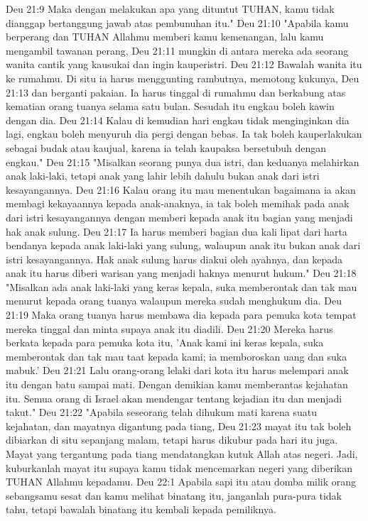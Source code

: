 Deu 21:9  Maka dengan melakukan apa yang dituntut TUHAN, kamu tidak dianggap bertanggung jawab atas pembunuhan itu."
Deu 21:10  "Apabila kamu berperang dan TUHAN Allahmu memberi kamu kemenangan, lalu kamu mengambil tawanan perang,
Deu 21:11  mungkin di antara mereka ada seorang wanita cantik yang kausukai dan ingin kauperistri.
Deu 21:12  Bawalah wanita itu ke rumahmu. Di situ ia harus menggunting rambutnya, memotong kukunya,
Deu 21:13  dan berganti pakaian. Ia harus tinggal di rumahmu dan berkabung atas kematian orang tuanya selama satu bulan. Sesudah itu engkau boleh kawin dengan dia.
Deu 21:14  Kalau di kemudian hari engkau tidak menginginkan dia lagi, engkau boleh menyuruh dia pergi dengan bebas. Ia tak boleh kauperlakukan sebagai budak atau kaujual, karena ia telah kaupaksa bersetubuh dengan engkau."
Deu 21:15  "Misalkan seorang punya dua istri, dan keduanya melahirkan anak laki-laki, tetapi anak yang lahir lebih dahulu bukan anak dari istri kesayangannya.
Deu 21:16  Kalau orang itu mau menentukan bagaimana ia akan membagi kekayaannya kepada anak-anaknya, ia tak boleh memihak pada anak dari istri kesayangannya dengan memberi kepada anak itu bagian yang menjadi hak anak sulung.
Deu 21:17  Ia harus memberi bagian dua kali lipat dari harta bendanya kepada anak laki-laki yang sulung, walaupun anak itu bukan anak dari istri kesayangannya. Hak anak sulung harus diakui oleh ayahnya, dan kepada anak itu harus diberi warisan yang menjadi haknya menurut hukum."
Deu 21:18  "Misalkan ada anak laki-laki yang keras kepala, suka memberontak dan tak mau menurut kepada orang tuanya walaupun mereka sudah menghukum dia.
Deu 21:19  Maka orang tuanya harus membawa dia kepada para pemuka kota tempat mereka tinggal dan minta supaya anak itu diadili.
Deu 21:20  Mereka harus berkata kepada para pemuka kota itu, 'Anak kami ini keras kepala, suka memberontak dan tak mau taat kepada kami; ia memboroskan uang dan suka mabuk.'
Deu 21:21  Lalu orang-orang lelaki dari kota itu harus melempari anak itu dengan batu sampai mati. Dengan demikian kamu memberantas kejahatan itu. Semua orang di Israel akan mendengar tentang kejadian itu dan menjadi takut."
Deu 21:22  "Apabila seseorang telah dihukum mati karena suatu kejahatan, dan mayatnya digantung pada tiang,
Deu 21:23  mayat itu tak boleh dibiarkan di situ sepanjang malam, tetapi harus dikubur pada hari itu juga. Mayat yang tergantung pada tiang mendatangkan kutuk Allah atas negeri. Jadi, kuburkanlah mayat itu supaya kamu tidak mencemarkan negeri yang diberikan TUHAN Allahmu kepadamu.
Deu 22:1  Apabila sapi itu atau domba milik orang sebangsamu sesat dan kamu melihat binatang itu, janganlah pura-pura tidak tahu, tetapi bawalah binatang itu kembali kepada pemiliknya.
